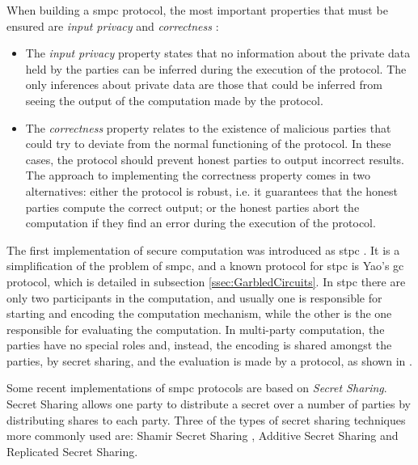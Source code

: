 When building a \ac{smpc} protocol, the most important properties that must be ensured are \textit{input privacy} and \textit{correctness} \cite{goldreich1998secure}:

\begin{itemize}
    

    \item The \textit{input privacy} property states that no information about the private data held by the parties can be inferred during the execution of the protocol. The only inferences about private data are those that could be inferred from seeing the output of the computation made by the protocol.

    \item The \textit{correctness} property relates to the existence of malicious parties that could try to deviate from the normal functioning of the protocol. In these cases, the protocol should prevent honest parties to output incorrect results. The approach to implementing the correctness property comes in two alternatives: either the protocol is robust, i.e. it guarantees that the honest parties compute the correct output; or the honest parties abort the computation if they find an error during the execution of the protocol.
\end{itemize}

The first implementation of secure computation was introduced as \ac{stpc} \cite{yao1982protocols}. It is a simplification of the problem of \ac{smpc}, and a known protocol for \ac{stpc} is Yao's \ac{gc} protocol, which is detailed in subsection \ref{ssec:GarbledCircuits}. In \ac{stpc} there are only two participants in the computation, and usually one is responsible for starting and encoding the computation mechanism, while the other is the one responsible for evaluating the computation. In multi-party computation, the parties have no special roles and, instead, the encoding is shared amongst the parties, by secret sharing, and the evaluation is made by a protocol, as shown in \cite{ben2008fairplaymp}.

Some recent implementations of \ac{smpc} protocols are based on \textit{Secret Sharing}. Secret Sharing allows one party to distribute a secret over a number of parties by distributing shares to each party. Three of the types of secret sharing techniques more commonly used are: Shamir Secret Sharing \cite{shamir1979share}, Additive Secret Sharing and Replicated Secret Sharing.






